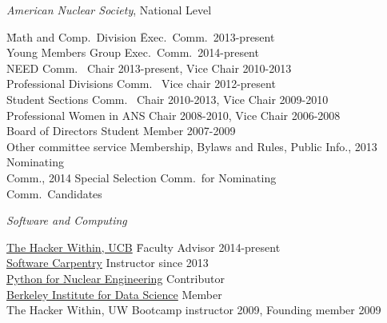 \textit{American Nuclear Society}, National Level
\begin{tabbing}
\hspace*{2 em}\= Math and Comp.\ Division \hspace*{2em} \= Exec.\ Comm.\ 2013-present \\
%
\> Young Members Group \> Exec.\ Comm.\ 2014-present\\
%
\> NEED Comm.\ \> Chair 2013-present, Vice Chair 2010-2013\\
%
\> Professional Divisions Comm.\ \>	Vice chair 2012-present \\
%
\> Student Sections Comm.\ \> Chair 2010-2013, Vice Chair 2009-2010\\
%
\> Professional Women in ANS	\> Chair 2008-2010, Vice Chair 2006-2008\\	
%
\> Board of Directors \>	Student Member 2007-2009\\
%
\> Other committee service \>	Membership, Bylaws and Rules, Public Info., 2013 Nominating\\ \> \> Comm., 2014 Special Selection Comm.\  for Nominating\\ \> \> Comm.\ Candidates
\end{tabbing}

\vspace*{-.5em}
\textit{Software and Computing}
\begin{tabbing}
\hspace*{2 em}\= \href{http://thehackerwithin.github.io/berkeley/}{The Hacker Within, UCB} \hspace*{4em} \= Faculty Advisor 2014-present\\
%
\> \href{http://software-carpentry.org/}{Software Carpentry}  \> Instructor since 2013\\
%
\> \href{http://pyne.io/}{Python for Nuclear Engineering}  \> Contributor \\
%
\> \href{http://bids.berkeley.edu/}{Berkeley Institute for Data Science}  \> Member \\
%
\> The Hacker Within, UW \> Bootcamp instructor 2009, Founding member 2009
\end{tabbing}

